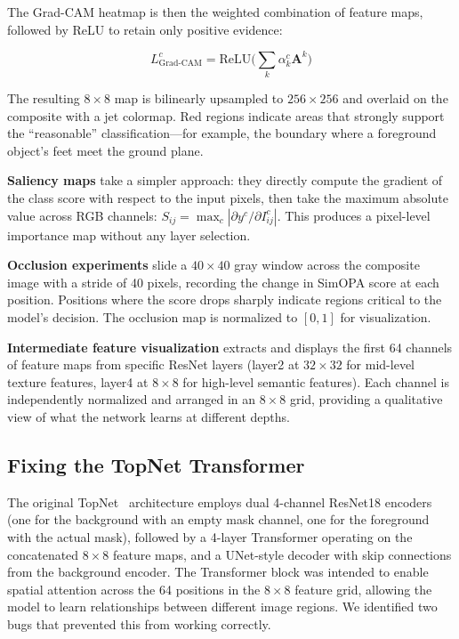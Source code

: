 \documentclass[10pt,twocolumn]{article}
\begin{document}
The Grad-CAM heatmap is then the weighted combination of feature maps, followed by ReLU to retain only positive evidence:

\begin{equation}
L_{\text{Grad-CAM}}^c = \text{ReLU}\Big(\sum_k \alpha_k^c \mathbf{A}^k\Big)
\end{equation}

The resulting $8\times 8$ map is bilinearly upsampled to $256\times 256$ and overlaid on the composite with a jet colormap. Red regions indicate areas that strongly support the ``reasonable'' classification---for example, the boundary where a foreground object's feet meet the ground plane.

\textbf{Saliency maps} take a simpler approach: they directly compute the gradient of the class score with respect to the input pixels, then take the maximum absolute value across RGB channels: $S_{ij} = \max_c |\partial y^c / \partial I_{ij}^c|$. This produces a pixel-level importance map without any layer selection.

\textbf{Occlusion experiments} slide a $40\times 40$ gray window across the composite image with a stride of 40 pixels, recording the change in SimOPA score at each position. Positions where the score drops sharply indicate regions critical to the model's decision. The occlusion map is normalized to $[0,1]$ for visualization.

\textbf{Intermediate feature visualization} extracts and displays the first 64 channels of feature maps from specific ResNet layers (layer2 at $32\times 32$ for mid-level texture features, layer4 at $8\times 8$ for high-level semantic features). Each channel is independently normalized and arranged in an $8\times 8$ grid, providing a qualitative view of what the network learns at different depths.


\subsection{Fixing the TopNet Transformer}

The original TopNet~\cite{topnet} architecture employs dual 4-channel ResNet18 encoders (one for the background with an empty mask channel, one for the foreground with the actual mask), followed by a 4-layer Transformer operating on the concatenated $8\times 8$ feature maps, and a UNet-style decoder with skip connections from the background encoder. The Transformer block was intended to enable spatial attention across the 64 positions in the $8\times 8$ feature grid, allowing the model to learn relationships between different image regions. We identified two bugs that prevented this from working correctly.
\end{document}
